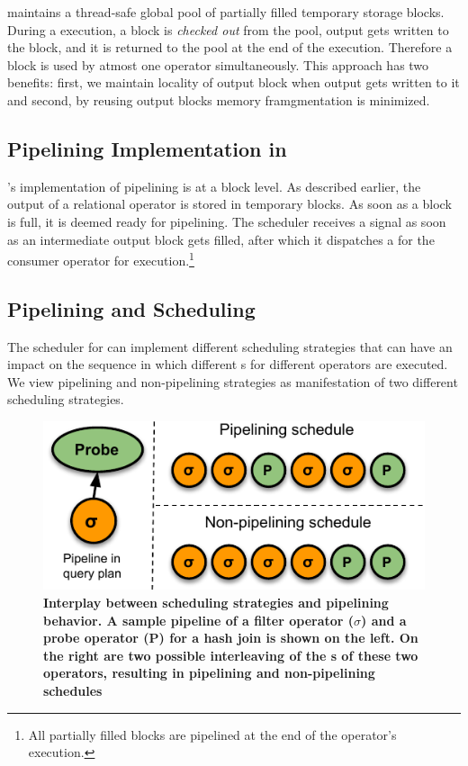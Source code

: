 \sys{} maintains a thread-safe global pool of partially filled temporary storage blocks.
During a \wo{} execution, a block is \textit{checked out} from the pool, output gets written to the block, and it is returned to the pool at the end of the execution. 
Therefore a block is used by atmost one operator \wo{} simultaneously. 
This approach has two benefits: first, we maintain locality of output block when output gets written to it and second, by reusing output blocks memory framgmentation is minimized. 

\subsection{Pipelining Implementation in \sys{}}
\sys{}'s implementation of pipelining is at a block level.
As described earlier, the output of a relational operator \wo{} is stored in temporary blocks.
As soon as a block is full, it is deemed ready for pipelining.
The scheduler receives a signal as soon as an intermediate output block gets filled, after which it dispatches a \wo{} for the consumer operator for execution.\footnote{All partially filled blocks are pipelined at the end of the operator's execution.}


\subsection{Pipelining and Scheduling}\label{ssec:system-scheduling}
The scheduler for \sys{} can implement different scheduling strategies that can have an impact on the sequence in which different \wo{}s for different operators are executed.
We view pipelining and non-pipelining strategies as manifestation of two different scheduling strategies. 

\begin{figure}[t]
	\centering 
	\includegraphics{pipeline/figures/Pipe-Nopipe-schedules}
	\caption{\textbf{Interplay between scheduling strategies and pipelining behavior. A sample pipeline of a filter operator ($\sigma$) and a probe operator (P) for a hash join is shown on the left. On the right are two possible interleaving of the \wo{}s of these two operators, resulting in pipelining and non-pipelining schedules}}
	\label{fig:pipelining-schedules}
\end{figure}

